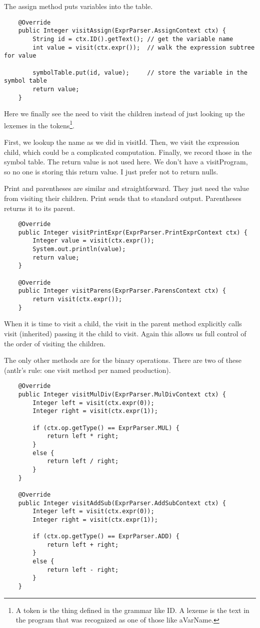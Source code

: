 The assign method puts variables into the table.

{\footnotesize
\begin{verbatim}
    @Override
    public Integer visitAssign(ExprParser.AssignContext ctx) {
        String id = ctx.ID().getText(); // get the variable name
        int value = visit(ctx.expr());  // walk the expression subtree for value

        symbolTable.put(id, value);     // store the variable in the symbol table
        return value;
    }
\end{verbatim}
}

Here we finally see the need to visit the children instead of just looking
up the lexemes in the tokens\footnote{A token is the thing defined in the grammar
like ID. A lexeme is the text in the program that was recognized as one of those
like aVarName.}.

First, we lookup the name as we did in visitId. Then, we visit the expression
child, which could be a complicated computation. Finally, we record those
in the symbol table. The return value is not used here. We don't have
a visitProgram, so no one is storing this return value. I just prefer not
to return nulls.

Print and parentheses are similar and straightforward. They just need the
value from visiting their children. Print sends that to standard output.
Parentheses returns it to its parent.

{\footnotesize
\begin{verbatim}
    @Override
    public Integer visitPrintExpr(ExprParser.PrintExprContext ctx) {
        Integer value = visit(ctx.expr());
        System.out.println(value);
        return value;
    }

    @Override
    public Integer visitParens(ExprParser.ParensContext ctx) {
        return visit(ctx.expr());
    }
\end{verbatim}
}

When it is time to visit a child, the visit in the parent method
explicitly calls visit (inherited) passing it the child to visit.
Again this allows us full control of the order of visiting the children.

The only other methods are for the binary operations. There are two
of these (antlr's rule: one visit method per named production).

{\footnotesize
\begin{verbatim}
    @Override
    public Integer visitMulDiv(ExprParser.MulDivContext ctx) {
        Integer left = visit(ctx.expr(0));
        Integer right = visit(ctx.expr(1));

        if (ctx.op.getType() == ExprParser.MUL) {
            return left * right;
        }
        else {
            return left / right;
        }
    }

    @Override
    public Integer visitAddSub(ExprParser.AddSubContext ctx) {
        Integer left = visit(ctx.expr(0));
        Integer right = visit(ctx.expr(1));

        if (ctx.op.getType() == ExprParser.ADD) {
            return left + right;
        }
        else {
            return left - right;
        }
    }
\end{verbatim}
}


